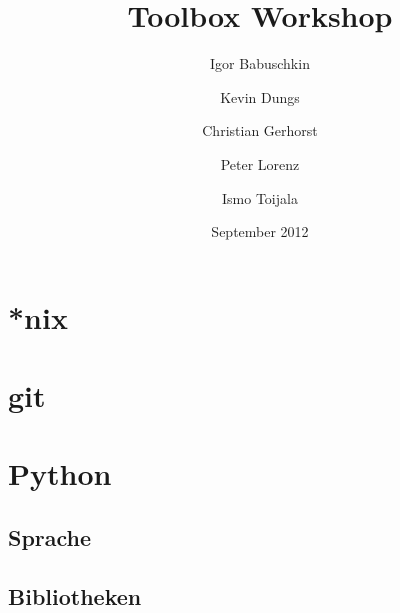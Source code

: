 \documentclass{beamer}
\title{Toolbox Workshop}
\author{Igor Babuschkin \and Kevin Dungs \and Christian Gerhorst \and Peter Lorenz \and Ismo Toijala}
\institute{PeP et al. e.V.}
\date{September 2012}
\begin{document}
  \begin{frame}
    \titlepage
  \end{frame}
  \begin{frame}
    \tableofcontents
  \end{frame}
  \section{*nix}
    \begin{frame}
    \end{frame}
  \section{git}
    \begin{frame}
    \end{frame}
  \section{Python}
    \begin{frame}
    \end{frame}
    \subsection{Sprache}
      \begin{frame}
      \end{frame}
    \subsection{Bibliotheken}
      \begin{frame}
      \end{frame}
\end{document}
